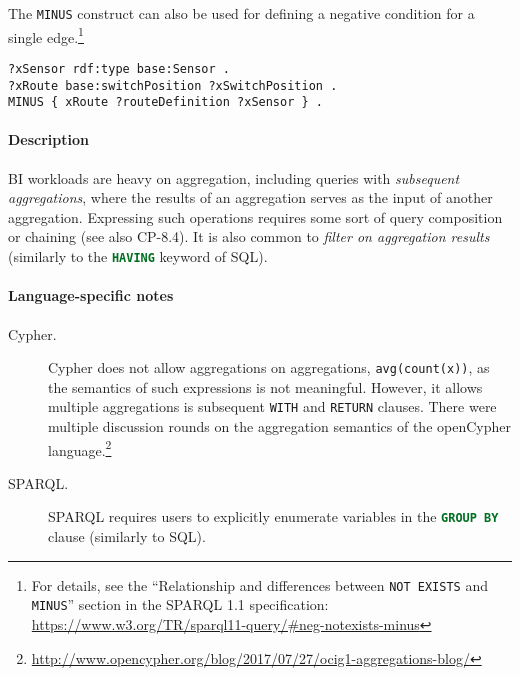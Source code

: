 \begin{description}
The \lstinline{MINUS} construct can also be used for defining a negative condition for a single edge.\footnote{For details, see the ``Relationship and differences between \lstinline[language=sparql]{NOT EXISTS} and \lstinline[language=sparql]{MINUS}'' section in the SPARQL 1.1 specification: \url{https://www.w3.org/TR/sparql11-query/\#neg-notexists-minus}}

\begin{minipage}{\linewidth}
\begin{lstlisting}[language=sparql]
?xSensor rdf:type base:Sensor .
?xRoute base:switchPosition ?xSwitchPosition .
MINUS { xRoute ?routeDefinition ?xSensor } .
\end{lstlisting}
\end{minipage}

\end{description}






\paragraph{Description}

BI workloads are heavy on aggregation, including queries with \emph{subsequent
aggregations}, where the results of an aggregation serves as the input of
another aggregation. Expressing such operations requires some sort of query
composition or chaining (see also CP-8.4). It is also common to \emph{filter on
aggregation results} (similarly to the \lstinline[language=sql]{HAVING} keyword of SQL).

\paragraph{Language-specific notes}

\begin{description}
\item[Cypher.] Cypher does not allow aggregations on aggregations, \eg \lstinline[language=cypher]{avg(count(x))}, as the semantics of such expressions is not meaningful. However, it allows multiple aggregations is subsequent \lstinline[language=cypher]{WITH} and  \lstinline[language=cypher]{RETURN} clauses. There were multiple discussion rounds on the aggregation semantics of the openCypher language.\footnote{\url{http://www.opencypher.org/blog/2017/07/27/ocig1-aggregations-blog/}}

\item[SPARQL.] SPARQL requires users to explicitly enumerate variables in the \lstinline[language=sql]{GROUP BY} clause (similarly to SQL).
\end{description}

